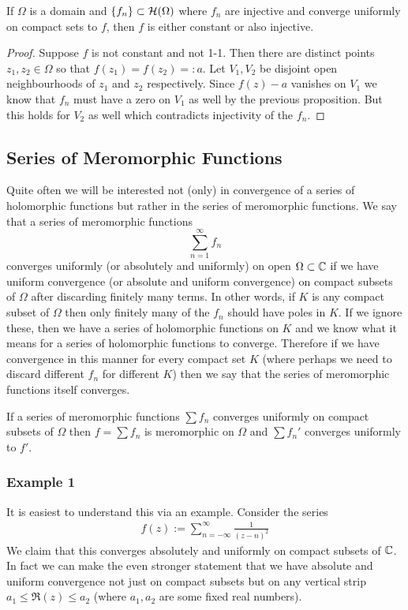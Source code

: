 \begin{corollary}\label{cor:hurwitz-cor}
    If $\Omega$ is a domain and $\{f_n\} \subset \mathcal{H}(\Omega)$ where $f_n$ are injective and converge uniformly on compact sets to $f$, then $f$ is either constant or also injective.
\end{corollary}
\begin{proof}
    Suppose $f$ is not constant and not 1-1. Then there are distinct points $z_1, z_2 \in \Omega$ so that $f(z_1) = f(z_2) =: a$. Let $V_1, V_2$ be disjoint open neighbourhoods of $z_1$ and $z_2$ respectively. Since $f(z) - a$ vanishes on $V_1$ we know that $f_n$ must have a zero on $V_1$ as well by the previous proposition. But this holds for $V_2$ as well which contradicts injectivity of the $f_n$. 
\end{proof}

\subsection{Series of Meromorphic Functions}
Quite often we will be interested not (only) in convergence of a series of holomorphic functions but rather in the series of meromorphic functions. 
We say that a series of meromorphic functions
$$\sum_{n = 1}^\infty f_n$$
converges uniformly (or absolutely and uniformly) on open $\Omega \subset \mathbb{C}$ if we have uniform convergence (or absolute and uniform convergence) on compact subsets of $\Omega$ after discarding finitely many terms. In other words, if $K$ is any compact subset of $\Omega$ then only finitely many of the $f_n$ should have poles in $K$. If we ignore these, then we have a series of holomorphic functions on $K$ and we know what it means for a series of holomorphic functions to converge. Therefore if we have convergence in this manner for every compact set $K$ (where perhaps we need to discard different $f_n$ for different $K$) then we say that the series of meromorphic functions itself converges. 

\begin{corollary}
    If a series of meromorphic functions $\sum f_n$ converges uniformly on compact subsets of $\Omega$ then $f = \sum f_n$ is meromorphic on $\Omega$ and $\sum f_n'$ converges uniformly to $f'$. 
\end{corollary}

\subsubsection{Example 1}
It is easiest to understand this via an example. Consider the series
\begin{align*}
    f(z) := \sum_{n = -\infty}^\infty \frac{1}{(z - n)^2}
\end{align*}
We claim that this converges absolutely and uniformly on compact subsets of $\mathbb{C}$. In fact we can make the even stronger statement that we have absolute and uniform convergence not just on compact subsets but on any vertical strip $a_1 \leq \Re(z) \leq a_2$ (where $a_1, a_2$ are some fixed real numbers).

